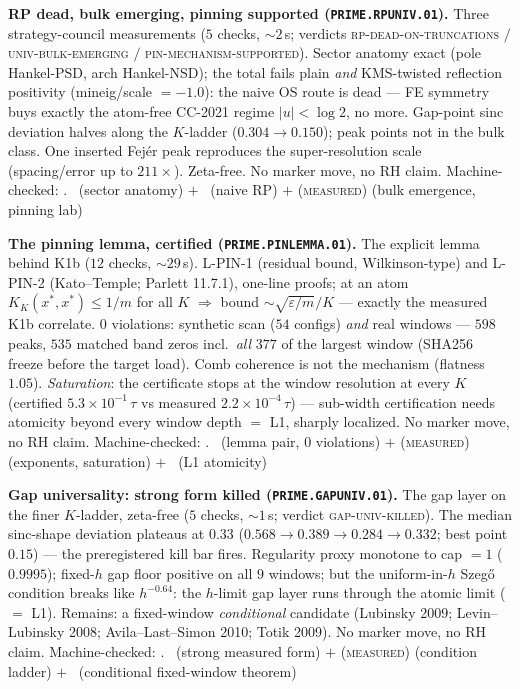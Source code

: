 \documentclass[11pt,a4paper]{article}
\theoremstyle{definition}
\begin{document}
\par\smallskip\noindent\textbf{RP dead, bulk emerging, pinning
supported (\texttt{PRIME.RPUNIV.01}).}
Three strategy-council measurements ($5$ checks, ${\sim}2$\,s;
verdicts \textsc{rp-dead-on-truncations} $/$
\textsc{univ-bulk-emerging} $/$ \textsc{pin-mechanism-supported}).
Sector anatomy exact (pole Hankel-PSD, arch Hankel-NSD); the total
fails plain \emph{and} KMS-twisted reflection positivity
(mineig/scale $=-1.0$): the naive OS route is dead --- FE symmetry
buys exactly the atom-free CC-2021 regime $|u|<\log2$, no more.
Gap-point sinc deviation halves along the $K$-ladder
($0.304\to0.150$); peak points not in the bulk class.  One inserted
Fej\'er peak reproduces the super-resolution scale (spacing/error up
to $211\times$).  Zeta-free.  No marker move, no RH claim.
Machine-checked: .
\mE\ (sector anatomy) $+$ \mX\ (naive RP) $+$ (\textsc{measured})
(bulk emergence, pinning lab)
\par\smallskip

\par\smallskip\noindent\textbf{The pinning lemma, certified
(\texttt{PRIME.PINLEMMA.01}).}
The explicit lemma behind K1b ($12$ checks, ${\sim}29$\,s).
L-PIN-1 (residual bound, Wilkinson-type) and L-PIN-2 (Kato--Temple;
Parlett 11.7.1), one-line proofs; at an atom $K_K(x^*,x^*)\le1/m$
for all $K$ $\Rightarrow$ bound $\sim\sqrt{\varepsilon/m}/K$ ---
exactly the measured K1b correlate.  $0$ violations: synthetic scan
($54$ configs) \emph{and} real windows --- $598$ peaks, $535$
matched band zeros incl.\ \emph{all} $377$ of the largest window
(SHA256 freeze before the target load).  Comb coherence is not the
mechanism (flatness $1.05$).  \emph{Saturation}: the certificate
stops at the window resolution at every $K$ (certified
$5.3\times10^{-1}\,\tau$ vs measured $2.2\times10^{-4}\,\tau$) ---
sub-width certification needs atomicity beyond every window depth
$=$ L1, sharply localized.  No marker move, no RH claim.
Machine-checked: .
\mE\ (lemma pair, $0$ violations) $+$ (\textsc{measured})
(exponents, saturation) $+$ \mO\ (L1 atomicity)
\par\smallskip

\par\smallskip\noindent\textbf{Gap universality: strong form killed
(\texttt{PRIME.GAPUNIV.01}).}
The gap layer on the finer $K$-ladder, zeta-free ($5$ checks,
${\sim}1$\,s; verdict \textsc{gap-univ-killed}).  The median
sinc-shape deviation plateaus at $0.33$ ($0.568\to0.389\to0.284\to
0.332$; best point $0.15$) --- the preregistered kill bar fires.
Regularity proxy monotone to cap $=1$ ($0.9995$); fixed-$h$ gap
floor positive on all $9$ windows; but the uniform-in-$h$
Szeg\H{o} condition breaks like $h^{-0.64}$: the $h$-limit gap
layer runs through the atomic limit ($=$ L1).  Remains: a
fixed-window \emph{conditional} candidate (Lubinsky 2009;
Levin--Lubinsky 2008; Avila--Last--Simon 2010; Totik 2009).  No
marker move, no RH claim.
Machine-checked: .
\mX\ (strong measured form) $+$ (\textsc{measured}) (condition
ladder) $+$ \mO\ (conditional fixed-window theorem)
\par\smallskip
\end{document}
